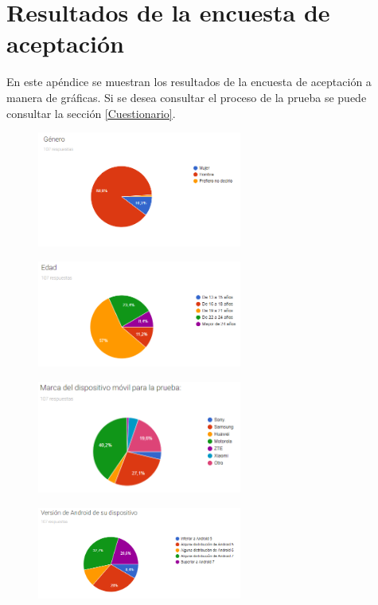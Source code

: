 \chapter{Resultados de la encuesta de aceptación} \label{Anexo:resultados}
En este apéndice se muestran los resultados de la encuesta de aceptación a 
manera de gráficas. Si se desea consultar el proceso de la prueba se puede 
consultar la sección \ref{Cuestionario}.

\begin{figure}[H]
    \centering
    \includegraphics[width=0.6\textwidth]{Anexos/respuestas/grafica01.png}
\end{figure}

\begin{figure}[H]
    \centering
    \includegraphics[width=0.6\textwidth]{Anexos/respuestas/grafica02.png}
\end{figure}

\begin{figure}[H]
    \centering
    \includegraphics[width=0.6\textwidth]{Anexos/respuestas/grafica03.png}
\end{figure}

\begin{figure}[H]
    \centering
    \includegraphics[width=0.6\textwidth]{Anexos/respuestas/grafica04.png}
\end{figure}

